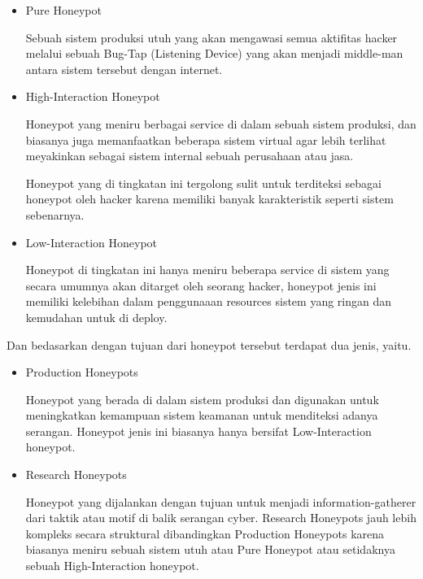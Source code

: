 \documentclass[12pt, a4paper]{article}
\begin{document}
    \begin{itemize}
      \item Pure Honeypot

        Sebuah sistem produksi utuh yang akan mengawasi semua aktifitas hacker
        melalui sebuah Bug-Tap (Listening Device) yang akan menjadi middle-man
        antara sistem tersebut dengan internet.

      \item High-Interaction Honeypot

        Honeypot yang meniru berbagai service di dalam sebuah sistem produksi,
        dan biasanya juga memanfaatkan beberapa sistem virtual agar lebih
        terlihat meyakinkan sebagai sistem internal sebuah perusahaan atau jasa.

        Honeypot yang di tingkatan ini tergolong sulit untuk terditeksi
        sebagai honeypot oleh hacker karena memiliki banyak karakteristik
        seperti sistem sebenarnya.

      \item Low-Interaction Honeypot

        Honeypot di tingkatan ini hanya meniru beberapa service di sistem yang
        secara umumnya akan ditarget oleh seorang hacker, honeypot jenis ini
        memiliki kelebihan dalam penggunaaan resources sistem yang ringan dan
        kemudahan untuk di deploy.

    \end{itemize}

    Dan bedasarkan dengan tujuan dari honeypot tersebut terdapat dua jenis, yaitu.

    \begin{itemize}

      \item Production Honeypots

        Honeypot yang berada di dalam sistem produksi dan digunakan untuk meningkatkan
        kemampuan sistem keamanan untuk menditeksi adanya serangan. Honeypot jenis
        ini biasanya hanya bersifat Low-Interaction honeypot.

      \item Research Honeypots

        Honeypot yang dijalankan dengan tujuan untuk menjadi information-gatherer
        dari taktik atau motif di balik serangan cyber. Research Honeypots jauh lebih
        kompleks secara struktural dibandingkan Production Honeypots karena biasanya
        meniru sebuah sistem utuh atau Pure Honeypot atau setidaknya sebuah
        High-Interaction honeypot.

    \end{itemize}
\end{document}
